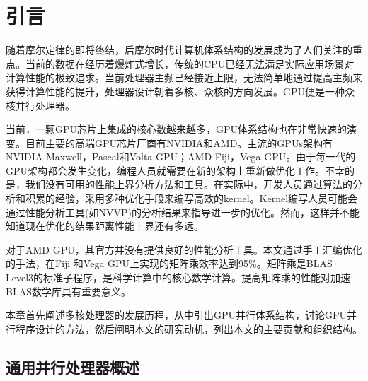 \chapter{引言}\label{chap:introduction}
%
%

随着摩尔定律的即将终结，后摩尔时代计算机体系结构的发展成为了人们关注的重点。当前的数据在经历着爆炸式增长，传统的CPU已经无法满足实际应用场景对计算性能的极致追求。当前处理器主频已经接近上限，无法简单地通过提高主频来获得计算性能的提升，处理器设计朝着多核、众核的方向发展。GPU便是一种众核并行处理器。

当前，一颗GPU芯片上集成的核心数越来越多，GPU体系结构也在非常快速的演变。目前主要的高端GPU芯片厂商有NVIDIA和AMD。主流的GPUs架构有NVIDIA Maxwell，Pascal和Volta GPU；AMD Fiji，Vega GPU。由于每一代的GPU架构都会发生变化，编程人员就需要在新的架构上重新做优化工作。不幸的是，我们没有可用的性能上界分析方法和工具。在实际中，开发人员通过算法的分析和积累的经验，采用多种优化手段来编写高效的kernel。Kernel编写人员可能会通过性能分析工具(如NVVP)的分析结果来指导进一步的优化。然而，这样并不能知道现在优化的结果距离性能上界还有多远。

对于AMD GPU，其官方并没有提供良好的性能分析工具。本文通过手工汇编优化的手法，在Fiji 和Vega GPU上实现的矩阵乘效率达到95\%。矩阵乘是BLAS Level3的标准子程序，是科学计算中的核心数学计算。提高矩阵乘的性能对加速BLAS数学库具有重要意义。

本章首先阐述多核处理器的发展历程，从中引出GPU并行体系结构，讨论GPU并行程序设计的方法，然后阐明本文的研究动机，列出本文的主要贡献和组织结构。

\section{通用并行处理器概述}

